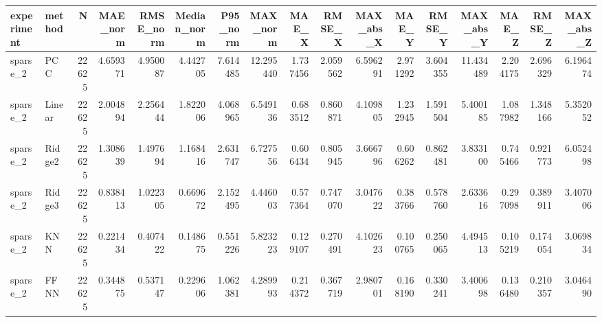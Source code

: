\begin{tabular}{llrrrrrrrrrrrrrrr}
\toprule
experiment & method & N & MAE_norm & RMSE_norm & Median_norm & P95_norm & MAX_norm & MAE_X & RMSE_X & MAX_abs_X & MAE_Y & RMSE_Y & MAX_abs_Y & MAE_Z & RMSE_Z & MAX_abs_Z \\
\midrule
sparse_2 & PCC & 22625 & 4.659371 & 4.950087 & 4.442705 & 7.614485 & 12.295440 & 1.737456 & 2.059562 & 6.596291 & 2.971292 & 3.604355 & 11.434489 & 2.204175 & 2.696329 & 6.196474 \\
sparse_2 & Linear & 22625 & 2.004894 & 2.256444 & 1.822006 & 4.068965 & 6.549136 & 0.683512 & 0.860871 & 4.109805 & 1.232945 & 1.591504 & 5.400185 & 1.087982 & 1.348166 & 5.352052 \\
sparse_2 & Ridge2 & 22625 & 1.308639 & 1.497694 & 1.168416 & 2.631747 & 6.727556 & 0.606434 & 0.805945 & 3.666796 & 0.606262 & 0.862481 & 3.833100 & 0.745466 & 0.921773 & 6.052498 \\
sparse_2 & Ridge3 & 22625 & 0.838413 & 1.022305 & 0.669672 & 2.152495 & 4.446003 & 0.577364 & 0.747070 & 3.047622 & 0.383766 & 0.578760 & 2.633616 & 0.297098 & 0.389911 & 3.407006 \\
sparse_2 & KNN & 22625 & 0.221434 & 0.407422 & 0.148675 & 0.551226 & 5.823223 & 0.129107 & 0.270491 & 4.102623 & 0.100765 & 0.250065 & 4.494513 & 0.105219 & 0.174054 & 3.069834 \\
sparse_2 & FFNN & 22625 & 0.344875 & 0.537147 & 0.229606 & 1.062381 & 4.289993 & 0.214372 & 0.367719 & 2.980701 & 0.168190 & 0.330241 & 3.400698 & 0.136480 & 0.210357 & 3.046490 \\
\bottomrule
\end{tabular}
